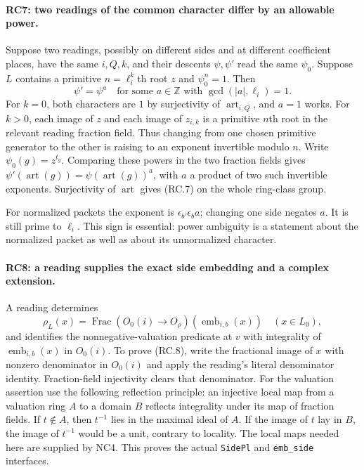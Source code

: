 \paragraph{RC7: two readings of the common character differ by an allowable power.}
Suppose two readings, possibly on different sides and at different
coefficient places, have the same $i,Q,k$, and their descents $\psi,\psi'$
read the same $\psi_0$. Suppose $L$ contains a primitive
$n=\ell_i^k$th root $z$ and $\psi_0^n=1$. Then
\[
 \psi'=\psi^a\quad\text{for some }a\in\mathbb Z
 \text{ with }\gcd(|a|,\ell_i)=1.                        \tag{RC.7}
\]
For $k=0$, both characters are $1$ by surjectivity of
$\operatorname{art}_{i,Q}$, and $a=1$ works.
For $k>0$, each image of $z$ and each image of $z_{i,k}$ is a primitive
$n$th root in the relevant reading fraction field. Thus changing from
one chosen primitive generator to the other is raising to an exponent
invertible modulo $n$. Write $\psi_0(g)=z^{t_g}$.
Comparing these powers in the two fraction fields gives
$\psi'(\operatorname{art}(g))
 =\psi(\operatorname{art}(g))^a$, with $a$ a product of two such
invertible exponents. Surjectivity of $\operatorname{art}$ gives (RC.7)
on the whole ring-class group.

For normalized packets the exponent is
$\epsilon_{b'}\epsilon_b a$; changing one side negates $a$.
It is still prime to $\ell_i$. This sign is essential: power ambiguity
is a statement about the normalized packet as well as about its
unnormalized character.

\paragraph{RC8: a reading supplies the exact side embedding and a complex extension.}
A reading determines
\[
 \rho_L(x)=\operatorname{Frac}(O_0(i)\to O_\rho)
                  (\operatorname{emb}_{i,b}(x))
       \quad(x\in L_0),                                 \tag{RC.8}
\]
and identifies the nonnegative-valuation predicate at $v$ with
integrality of $\operatorname{emb}_{i,b}(x)$ in $O_0(i)$.
To prove (RC.8), write the fractional image of $x$ with nonzero
denominator in $O_0(i)$ and apply the reading's literal
denominator identity. Fraction-field injectivity clears that denominator.
For the valuation assertion use the following reflection principle:
an injective local map from a valuation ring $A$ to a domain $B$
reflects integrality under its map of fraction fields.
If $t\notin A$, then $t^{-1}$ lies in the maximal ideal of $A$.
If the image of $t$ lay in $B$, the image of $t^{-1}$ would be a unit,
contrary to locality. The local maps needed here are supplied by NC4.
This proves the actual \texttt{SidePl} and \texttt{emb\_side} interfaces.

